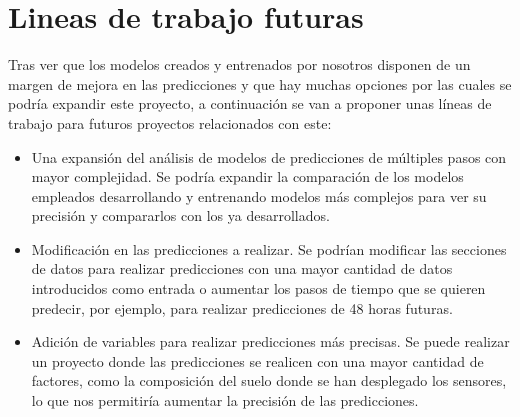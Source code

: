 \section{Lineas de trabajo futuras}

Tras ver que los modelos creados y entrenados por nosotros disponen de un margen de mejora en las predicciones y que hay muchas opciones por las cuales se podría expandir este proyecto, a continuación se van a proponer unas líneas de trabajo para futuros proyectos relacionados con este:

\begin{itemize}
    \item Una expansión del análisis de modelos de predicciones de múltiples pasos con mayor complejidad. Se podría expandir la comparación de los modelos empleados desarrollando y entrenando modelos más complejos para ver su precisión y compararlos con los ya desarrollados.
    \item Modificación en las predicciones a realizar. Se podrían modificar las secciones de datos para realizar predicciones con una mayor cantidad de datos introducidos como entrada o aumentar los pasos de tiempo que se quieren predecir, por ejemplo, para realizar predicciones de 48 horas futuras.
    \item Adición de variables para realizar predicciones más precisas. Se puede realizar un proyecto donde las predicciones se realicen con una mayor cantidad de factores, como la composición del suelo donde se han desplegado los sensores, lo que nos permitiría aumentar la precisión de las predicciones.
\end{itemize}